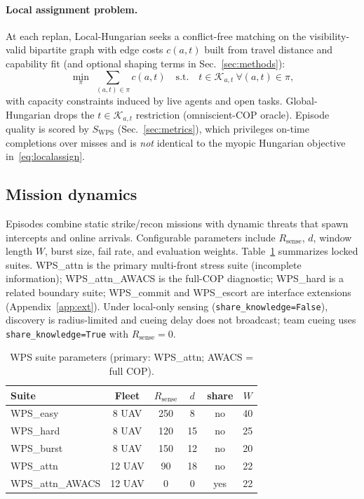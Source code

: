 \documentclass[journal,twocolumn,10pt]{IEEEtran}
\begin{document}
\paragraph{Local assignment problem.}
At each replan, Local-Hungarian seeks a conflict-free matching on the visibility-valid bipartite graph
with edge costs \(c(a,t)\) built from travel distance and capability fit (and optional shaping terms in Sec.~\ref{sec:methods}):
\begin{equation}
\min_{\pi}\;\sum_{(a,t)\in\pi} c(a,t)
\quad\text{s.t.}\quad
t\in\mathcal{K}_{a,t}\ \forall (a,t)\in\pi,
\label{eq:localassign}
\end{equation}
with capacity constraints induced by live agents and open tasks.
Global-Hungarian drops the \(t\in\mathcal{K}_{a,t}\) restriction (omniscient-COP oracle).
Episode quality is scored by \(S_{\mathrm{WPS}}\) (Sec.~\ref{sec:metrics}), which privileges on-time completions over misses and is \emph{not} identical to the myopic Hungarian objective in~\eqref{eq:localassign}.

\subsection{Mission dynamics}
Episodes combine static strike/recon missions with dynamic threats that spawn intercepts and online arrivals.
Configurable parameters include \(R_{\mathrm{sense}}\), \(d\), window length \(W\), burst size, fail rate, and evaluation weights.
Table~\ref{tab:suites} summarizes locked suites.
WPS\_attn is the primary multi-front stress suite (incomplete information); WPS\_attn\_AWACS is the full-COP diagnostic; WPS\_hard is a related boundary suite; WPS\_commit and WPS\_escort are interface extensions (Appendix~\ref{app:ext}).
Under local-only sensing (\texttt{share\_knowledge=False}), discovery is radius-limited and cueing delay does not broadcast; team cueing uses \texttt{share\_knowledge=True} with \(R_{\mathrm{sense}}{=}0\).

\begin{table}[t]
\centering
\caption{WPS suite parameters (primary: WPS\_attn; AWACS = full COP).}
\label{tab:suites}
\setlength{\tabcolsep}{2.5pt}
\begin{tabular}{lccccc}
\toprule
Suite & Fleet & \(R_{\mathrm{sense}}\) & \(d\) & share & \(W\) \\
\midrule
WPS\_easy & 8 UAV & 250 & 8 & no & 40 \\
WPS\_hard & 8 UAV & 120 & 15 & no & 25 \\
WPS\_burst & 8 UAV & 150 & 12 & no & 20 \\
WPS\_attn & 12 UAV & 90 & 18 & no & 22 \\
WPS\_attn\_AWACS & 12 UAV & 0 & 0 & yes & 22 \\
\bottomrule
\end{tabular}
\end{table}
\end{document}
